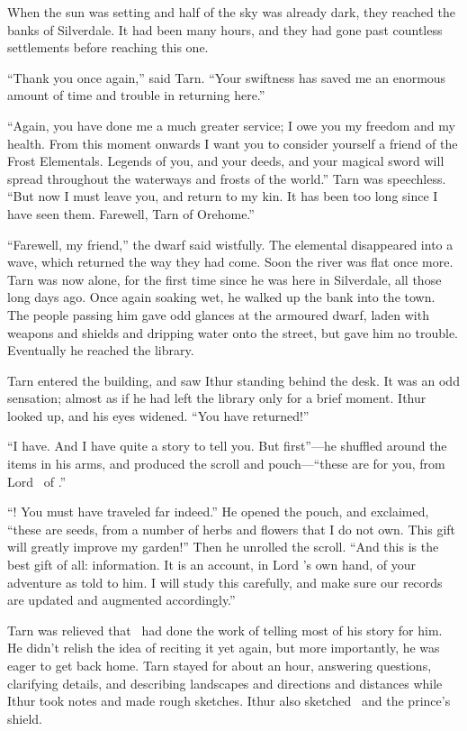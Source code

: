 When the sun was setting and half of the sky was already dark, they reached the banks of Silverdale.  It had been many hours, and they had gone past countless settlements before reaching this one.

``Thank you once again,'' said Tarn.  ``Your swiftness has saved me an enormous amount of time and trouble in returning here.''

``Again, you have done me a much greater service; I owe you my freedom and my health.  From this moment onwards I want you to consider yourself a friend of the Frost Elementals.  Legends of you, and your deeds, and your magical sword will spread throughout the waterways and frosts of the world.''  Tarn was speechless.  ``But now I must leave you, and return to my kin.  It has been too long since I have seen them.  Farewell, Tarn of Orehome.''

``Farewell, my friend,'' the dwarf said wistfully.  The elemental disappeared into a wave, which returned the way they had come.  Soon the river was flat once more.  Tarn was now alone, for the first time since he was here in Silverdale, all those long days ago.  Once again soaking wet, he walked up the bank into the town.  The people passing him gave odd glances at the armoured dwarf, laden with weapons and shields and dripping water onto the street, but gave him no trouble.  Eventually he reached the library.

Tarn entered the building, and saw Ithur standing behind the desk.  It was an odd sensation; almost as if he had left the library only for a brief moment.  Ithur looked up, and his eyes widened.  ``You have returned!''

``I have.  And I have quite a story to tell you.  But first''---he shuffled around the items in his arms, and produced the scroll and pouch---``these are for you, from Lord \arilor\ of \inarthonor.''

``\inarthonor!  You must have traveled far indeed.''  He opened the pouch, and exclaimed, ``these are seeds, from a number of herbs and flowers that I do not own.  This gift will greatly improve my garden!''  Then he unrolled the scroll.  ``And this is the best gift of all: information.  It is an account, in Lord \arilor's own hand, of your adventure as told to him.  I will study this carefully, and make sure our records are updated and augmented accordingly.''

Tarn was relieved that \arilor\ had done the work of telling most of his story for him.  He didn't relish the idea of reciting it yet again, but more importantly, he was eager to get back home.  Tarn stayed for about an hour, answering questions, clarifying details, and describing landscapes and directions and distances while Ithur took notes and made rough sketches.  Ithur also sketched \kildir\ and the prince's shield.

